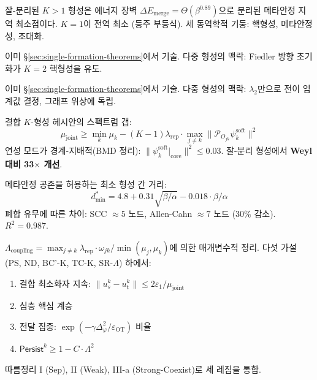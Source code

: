 \begin{theorem}
\label{thm:T-Merge}
잘-분리된 $K > 1$ 형성은 에너지 장벽 $\Delta E_{\mathrm{merge}} = \Theta(\beta^{0.89})$으로 분리된 메타안정 지역 최소점이다. $K = 1$이 전역 최소 (등주 부등식). 세 동역학적 기둥: 핵형성, 메타안정성, 조대화.
\end{theorem}

\begin{theorem}
이미 \S\ref{sec:single-formation-theorems}에서 기술. 다중 형성의 맥락: Fiedler 방향 초기화가 $K = 2$ 핵형성을 유도.
\end{theorem}

\begin{theorem}
이미 \S\ref{sec:single-formation-theorems}에서 기술. 다중 형성의 맥락: $\lambda_2$만으로 전이 임계값 결정, 그래프 위상에 독립.
\end{theorem}

\begin{theorem}
\label{thm:T-Beyond-Weyl}
결합 $K$-형성 헤시안의 스펙트럼 갭:
\[
\mu_{\mathrm{joint}} \geq \min_k \mu_k - (K-1)\lambda_{\mathrm{rep}} \cdot \max_{j \neq k} \|\mathcal{P}_{O_{jk}} \psi_k^{\mathrm{soft}}\|^2
\]
연성 모드가 경계-지배적(BMD 정리): $\|\psi_k^{\mathrm{soft}}|_{\mathrm{core}}\|^2 \leq 0.03$. 잘-분리 형성에서 \textbf{Weyl 대비 33$\times$ 개선}.
\end{theorem}

\begin{theorem}
\label{thm:T-dmin}
메타안정 공존을 허용하는 최소 형성 간 거리:
\[
d_{\min}^* = 4.8 + 0.31\sqrt{\beta/\alpha} - 0.018 \cdot \beta/\alpha
\]
폐합 유무에 따른 차이: SCC $\approx 5$ 노드, Allen-Cahn $\approx 7$ 노드 (30\% 감소). $R^2 = 0.987$.
\end{theorem}

\begin{theorem}
\label{thm:T-Persist-K-Unified}
$\Lambda_{\mathrm{coupling}} = \max_{j \neq k} \lambda_{\mathrm{rep}} \cdot \omega_{jk} / \min(\mu_j, \mu_k)$에 의한 매개변수적 정리. 다섯 가설 (PS, ND, BC'-K, TC-K, SR-$\Lambda$) 하에서:
\begin{enumerate}
    \item 결합 최소화자 지속: $\|u^k_s - u^k_t\| \leq 2\varepsilon_1/\mu_{\mathrm{joint}}$
    \item 심층 핵심 계승
    \item 전달 집중: $\exp(-\gamma\Delta_\varphi^2/\varepsilon_{\mathrm{OT}})$ 비율
    \item $\mathsf{Persist}^k \geq 1 - C \cdot \Lambda^2$
\end{enumerate}
따름정리 I (Sep), II (Weak), III-a (Strong-Coexist)로 세 레짐을 통합.
\end{theorem}


